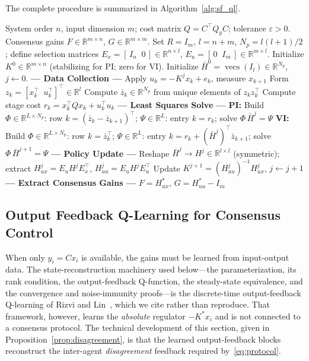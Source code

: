 \documentclass[12pt]{elsarticle}
\theoremstyle{remark}
\DeclareMathOperator{\vecs}{vecs}
\newcommand{\R}{\mathbb{R}}
\begin{document}
The complete procedure is summarized in Algorithm~\ref{alg:sf_ql}.
\begin{algorithm}[!htbp]
\caption{State Feedback Q-Learning for Consensus Gains}
\label{alg:sf_ql}
\begin{algorithmic}[1]
\REQUIRE System order $n$, input dimension $m$; cost matrix $Q = C^\top Q_y C$; tolerance $\varepsilon > 0$.
\ENSURE Consensus gains $F \in \R^{m \times n}$, $G \in \R^{m \times m}$.
\STATE Set $R = I_m$, $l = n + m$, $N_p = l(l+1)/2$; define selection matrices $E_x = [\,I_n \;\; 0\,] \in \R^{n \times l}$, $E_u = [\,0 \;\; I_m\,] \in \R^{m \times l}$.
\STATE Initialize $K^0 \in \R^{m \times n}$ (stabilizing for PI; zero for VI).
\STATE Initialize $\bar{H}^0 = \vecs(I_l) \in \R^{N_p}$, $j \leftarrow 0$.
\REPEAT
    \STATE \textbf{--- Data Collection ---}
        \STATE Apply $u_k = -K^j x_k + e_k$, measure $x_{k+1}$
        \STATE Form $z_k = [x_k^\top \;\; u_k^\top]^\top \in \R^l$
        \STATE Compute $\bar{z}_k \in \R^{N_p}$ from unique elements of $z_k z_k^\top$
        \STATE Compute stage cost $r_k = x_k^\top Q x_k + u_k^\top u_k$
    \ENDFOR
    \STATE \textbf{--- Least Squares Solve ---}
    \STATE \textbf{PI:} Build $\Phi \in \R^{L \times N_p}$: row $k = (\bar{z}_k - \bar{z}_{k+1})^\top$; \; $\Psi \in \R^L$: entry $k = r_k$; \; solve $\Phi \, \bar{H}^j = \Psi$
    \STATE \textbf{VI:} Build $\Phi \in \R^{L \times N_p}$: row $k = \bar{z}_k^\top$; \; $\Psi \in \R^L$: entry $k = r_k + (\bar{H}^j)^\top \bar{z}_{k+1}$; \; solve $\Phi \, \bar{H}^{j+1} = \Psi$
    \STATE \textbf{--- Policy Update ---}
    \STATE Reshape $\bar{H}^j \to H^j \in \R^{l \times l}$ (symmetric); extract $H_{ux}^j = E_u H^j E_x^\top$, \; $H_{uu}^j = E_u H^j E_u^\top$
    \STATE Update $K^{j+1} = (H_{uu}^j)^{-1} H_{ux}^j$, \; $j \leftarrow j + 1$
\STATE \textbf{--- Extract Consensus Gains ---}
\STATE $F = H_{ux}^*$, \quad $G = H_{uu}^* - I_m$
\end{algorithmic}
\end{algorithm}
\subsection{Output Feedback Q-Learning for Consensus Control}
\label{sec:ofb_ql}
When only $y_i = Cx_i$ is available, the gains must be learned from input-output data. The state-reconstruction machinery used below---the parameterization, its rank condition, the output-feedback Q-function, the steady-state equivalence, and the convergence and noise-immunity proofs---is the discrete-time output-feedback Q-learning of Rizvi and Lin~\cite{rizvi2022}, which we cite rather than reproduce. That framework, however, learns the \emph{absolute} regulator $-K^*x_i$ and is not connected to a consensus protocol. The technical development of this section, given in Proposition~\ref{prop:disagreement}, is that the learned output-feedback blocks reconstruct the inter-agent \emph{disagreement} feedback required by~\eqref{eq:protocol}.
\end{document}

